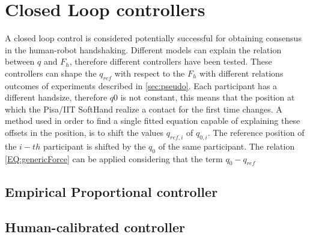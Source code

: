 \chapter{Closed Loop controllers}
A closed loop control is considered potentially successful for obtaining consensus in the human-robot handshaking. Different models can explain the relation between $q$ and $F_{h}$, therefore different controllers have been tested.
These controllers can shape the $q_{ref}$ with respect to the $F_{h}$ with different relations outcomes of experiments described in \ref{sec:pseudo}. 
Each participant has a different handsize, therefore $q0$ is not constant, this means that the position at which the Pisa/IIT SoftHand realize a contact for the first time changes.
A method used in order to find a single fitted equation capable of explaining these offsets in the position, is to shift the values $q_{ref,i}$ of $q_{0,i}$. The reference position of the $i-th$ participant is shifted by the $q_{0}$ of the same participant. The relation \ref{EQ:genericForce} can be applied considering that the term $q_{0}-q_{ref}$

\section{Empirical Proportional controller}
\section{Human-calibrated controller}